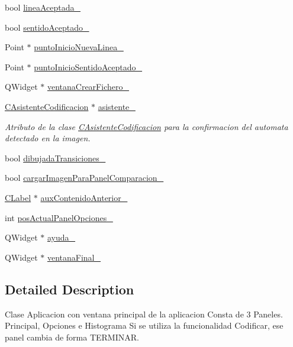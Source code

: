 \begin{DoxyCompactItemize}
\item 
bool \hyperlink{classCAplicacion_aa15f0bf9a36791195739ec2a6d15108d}{linea\+Aceptada\+\_\+}
\item 
bool \hyperlink{classCAplicacion_a84891ee9944902c6c72827cabf65b06b}{sentido\+Aceptado\+\_\+}
\item 
Point $\ast$ \hyperlink{classCAplicacion_a93f28ca7c41191c6daea7c872b199735}{punto\+Inicio\+Nueva\+Linea\+\_\+}
\item 
Point $\ast$ \hyperlink{classCAplicacion_a6376b998f7b79f9fa8c832c61eec483e}{punto\+Inicio\+Sentido\+Aceptado\+\_\+}
\item 
Q\+Widget $\ast$ \hyperlink{classCAplicacion_a8887fbd8545bcf5450e48213019b9596}{ventana\+Crear\+Fichero\+\_\+}
\item 
\hyperlink{classCAsistenteCodificacion}{C\+Asistente\+Codificacion} $\ast$ \hyperlink{classCAplicacion_a73e41911955009775d15b51595507351}{asistente\+\_\+}
\begin{DoxyCompactList}\small\item\em Atributo de la clase \hyperlink{classCAsistenteCodificacion}{C\+Asistente\+Codificacion} para la confirmacion del automata detectado en la imagen. \end{DoxyCompactList}\item 
bool \hyperlink{classCAplicacion_a840e9b831cb283803cea173f67a5e05e}{dibujada\+Transiciones\+\_\+}
\item 
bool \hyperlink{classCAplicacion_ac9b58ec62a0ea85cee5d89a5c64d4f62}{cargar\+Imagen\+Para\+Panel\+Comparacion\+\_\+}
\item 
\hyperlink{classCLabel}{C\+Label} $\ast$ \hyperlink{classCAplicacion_a14caad4d922c616e5efcfcd2ef30c443}{aux\+Contenido\+Anterior\+\_\+}
\item 
int \hyperlink{classCAplicacion_a86033e0418279102b23f98cd85d9bdf0}{pos\+Actual\+Panel\+Opciones\+\_\+}
\item 
Q\+Widget $\ast$ \hyperlink{classCAplicacion_aef00c8e06da0cd5fce3c7b938035fc6b}{ayuda\+\_\+}
\item 
Q\+Widget $\ast$ \hyperlink{classCAplicacion_ab28e00903a21b19a023e3762bea723c6}{ventana\+Final\+\_\+}
\end{DoxyCompactItemize}


\subsection{Detailed Description}
Clase Aplicacion con ventana principal de la aplicacion Consta de 3 Paneles. Principal, Opciones e Histograma Si se utiliza la funcionalidad Codificar, ese panel cambia de forma T\+E\+R\+M\+I\+N\+AR. 

